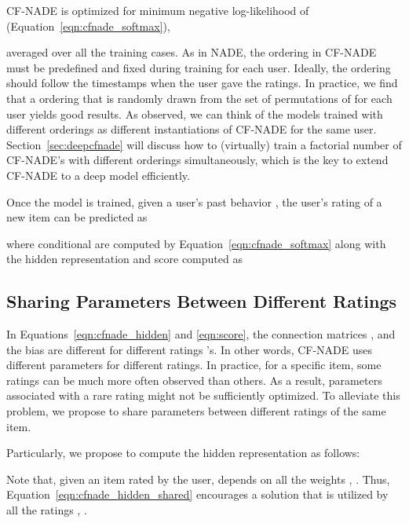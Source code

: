 \documentclass{article}
\newcommand{\cfnade}{CF-NADE\xspace}
\begin{document}
\cfnade is optimized for minimum negative log-likelihood of
 (Equation~\eqref{eqn:cfnade_softmax}),

averaged over all the training cases. As in NADE, the ordering  in
\cfnade must be predefined and fixed during training for each
user. Ideally, the ordering should follow the timestamps when the user
gave the ratings. In practice, we find that a ordering that is
randomly drawn from the set of permutations of  for
each user  yields good results. As \citet{Uria2013b} observed, we can think of the models trained with different orderings as different instantiations of \cfnade for the same user.
Section~\ref{sec:deepcfnade} will discuss how to (virtually) train a factorial number of \cfnade 's with different orderings simultaneously, which is the key to extend \cfnade to a deep model efficiently.





Once the model is trained, given a user's past behavior , the user's rating of
a new item  can be predicted as 

where conditional  are computed by Equation~\ref{eqn:cfnade_softmax} along with the hidden representation  and score  computed as 







\subsection{Sharing Parameters Between Different Ratings}
\label{sec:accu}

In Equations~\ref{eqn:cfnade_hidden} and \ref{eqn:score}, the
connection matrices ,  and the bias 
are different for different ratings 's. In other words, \cfnade
uses different parameters for different ratings. In practice, for a
specific item, some ratings can be much more often observed than
others.  As a result, parameters associated with a rare rating might
not be sufficiently optimized. To alleviate this problem, we propose
to share parameters between different ratings of the same item.

Particularly, we propose to compute the hidden representation  as follows:

Note that, given an item  rated  by the user,
 depends on all the weights
, . Thus,
Equation~\ref{eqn:cfnade_hidden_shared} encourages a solution that
 is utilized by all the ratings , .
\end{document}
